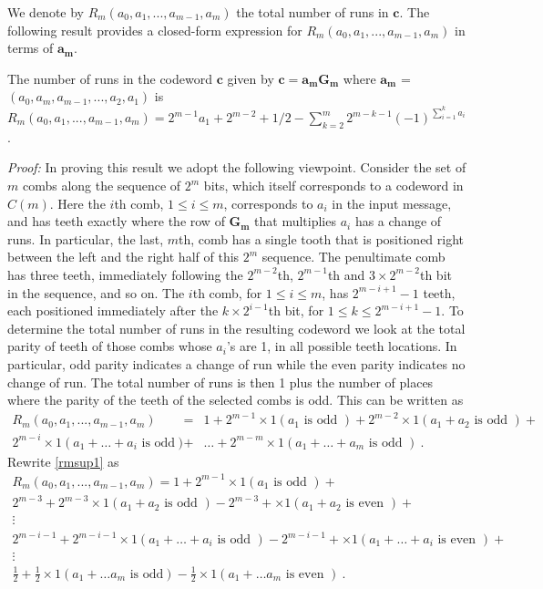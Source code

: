 We denote by $R_m(a_0,a_1,...,a_{m-1},a_m)$ the total number of runs
in $\mathbf{c}$. The following result provides a closed-form
expression for $R_m(a_0,a_1,...,a_{m-1},a_m)$ in terms of
$\mathbf{a_m}$.

\begin{lemma} The number of runs in the codeword $\mathbf{c}$
given by $\mathbf{c}=\mathbf{a_mG_m}$ where $\mathbf{a_m}$ =
$(a_0,a_m,a_{m-1},...,a_2,a_1)$ is
$R_m(a_0,a_1,...,a_{m-1},a_m)=2^{m-1}a_1+2^{m-2}+1/2-$\newline\noindent$\sum_{k=2}^m
2^{m-k-1}(-1)^{\sum_{i=1}^ka_i}$.
\end{lemma}
\noindent \textit{Proof:} In proving this result we adopt the
following viewpoint. Consider the set of $m$ combs along the
sequence of $2^m$ bits, which itself corresponds to a codeword in
$C(m)$. Here the $i$th comb, $1 \leq i \leq m$, corresponds to $a_i$
in the input message, and has teeth exactly where the row of
$\mathbf{G_m}$ that multiplies $a_i$ has a change of runs. In
particular, the last, $m$th, comb has a single tooth that is
positioned right between the left and the right half of this $2^m$
sequence. The penultimate comb has three teeth, immediately
following the $2^{m-2}$th, $2^{m-1}$th and $3\times 2^{m-2}$th bit
in the sequence, and so on. The $i$th comb, for $1 \leq i \leq m$,
has $2^{m-i+1}-1$ teeth, each positioned immediately after the
$k\times 2^{i-1}$th bit, for $1 \leq k \leq 2^{m-i+1}-1$. To
determine the total number of runs in the resulting codeword we look
at the total parity of teeth of those combs whose $a_i$'s are 1, in
all possible teeth locations. In particular, odd parity indicates a
change of run while the even parity indicates no change of run. The
total number of runs is then 1 plus the number of places where the
parity of the teeth of the selected combs is odd. This can be
written as
\begin{equation}\label{rmsup1}\begin{array}{lll}R_m(a_0,a_1,...,a_{m-1},a_m)&=&1+2^{m-1}\times1(a_1 \text{ is odd })+2^{m-2}\times1(a_1+a_2 \text{ is odd })+\\
2^{m-i}\times 1(a_1+\dots +a_i \text{ is odd
})&+&\dots+2^{m-m}\times1(a_1+\dots +a_m \text{ is odd })~.
 \end{array}\end{equation}
Rewrite \eqref{rmsup1} as
\begin{equation}\label{rmsup2}\begin{array}{lll}R_m(a_0,a_1,...,a_{m-1},a_m)=1+2^{m-1}\times1(a_1 \text{ is odd })+\\
2^{m-3}+2^{m-3}\times1(a_1+a_2 \text{ is odd })-2^{m-3}+\times1(a_1+a_2 \text{ is even })+\\
{} \vdots\\
2^{m-i-1}+2^{m-i-1}\times1(a_1+\dots+a_i \text{ is odd })-2^{m-i-1}+\times1(a_1+\dots+a_i \text{ is even })+\\
{}\vdots\\
\frac{1}{2}+ \frac{1}{2}\times1(a_1+\dots a_m \text{ is odd
})-\frac{1}{2}\times1(a_1+\dots a_m \text{ is even })~.
 \end{array}\end{equation}
